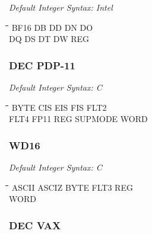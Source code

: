 {\em Default Integer Syntax: Intel}

{\tt\begin{tabbing}
\hspace{3cm}\=\hspace{3cm}\=\hspace{3cm}\=\hspace{3cm}\=\kill
BF16       \> DB          \> DD          \> DN          \> DO \\
DQ         \> DS          \> DT          \> DW          \> REG \\
\end{tabbing}}

\subsubsection{DEC PDP-11}

{\em Default Integer Syntax: C}

{\tt\begin{tabbing}
\hspace{3cm}\=\hspace{3cm}\=\hspace{3cm}\=\hspace{3cm}\=\kill
BYTE       \> CIS         \> EIS         \> FIS         \> FLT2 \\
FLT4       \> FP11        \> REG         \> SUPMODE     \> WORD \\
\end{tabbing}}

\subsubsection{WD16}

{\em Default Integer Syntax: C}

{\tt\begin{tabbing}
\hspace{3cm}\=\hspace{3cm}\=\hspace{3cm}\=\hspace{3cm}\=\kill
ASCII       \> ASCIZ        \>BYTE         \> FLT3        \> REG \\
WORD \\
\end{tabbing}}

\subsubsection{DEC VAX}

